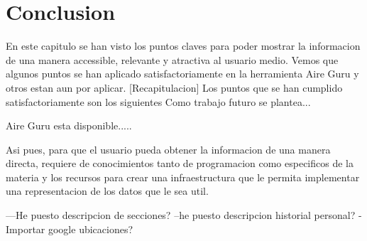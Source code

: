 \section{Conclusion}
En este capitulo se han visto los puntos claves para poder mostrar la informacion de una manera accessible,
relevante y atractiva al usuario medio. Vemos que algunos puntos se han aplicado satisfactoriamente en la herramienta
Aire Guru y otros estan aun por aplicar.
[Recapitulacion]
Los puntos que se han cumplido satisfactoriamente son los siguientes
Como trabajo futuro se plantea...
 

Aire Guru esta disponible.....



Asi pues, para que el usuario pueda obtener la informacion de una manera directa, requiere de conocimientos tanto 
de programacion como especificos de la materia y los recursos para crear una infraestructura que le permita implementar 
una representacion de los datos que le sea util.

---He puesto descripcion de secciones?
--he puesto descripcion historial personal?
-Importar google ubicaciones?